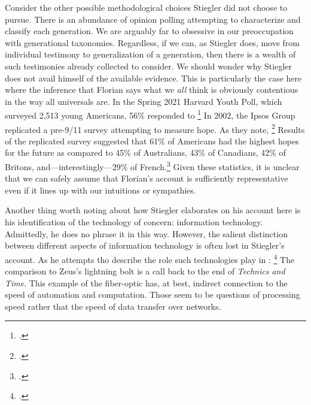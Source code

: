 \documentclass[letterpaper,notitlepage,12pt]{article}
\begin{document}
Consider the other possible methodological choices Stiegler did not choose to
pursue.
There is an abundance of opinion polling attempting to characterize and classify
each generation.
We are arguably far to obsessive in our preoccupation with generational
taxonomies.
Regardless, if we can, as Stiegler does, move from individual testimony to
generalization of a generation, then there is a wealth of such testimonies
already collected to consider.
We should wonder why Stiegler does not avail himself of the available evidence.
This is particularly the case here where the inference that Florian says what we
\textit{all} think is obviously contentious in the way all universals are.
In the Spring 2021 Harvard Youth Poll, which surveyed 2,513 young Americans,
56\% responded  to \footcite{noauthor_spring_nodate}
In 2002, the  Ipsos Group replicated a pre-9/11 survey attempting to measure
hope.
As they note, \footcite{noauthor_measuring_2002}
Results of the replicated survey suggested that 61\% of Americans had the
highest hopes for the future as compared to 45\% of Australians, 43\% of
Canadians, 42\% of Britons, and---interestingly---29\% of
French.\footcite{noauthor_measuring_2002}
Given these statistics, it is unclear that we can safely assume that Florian's
account is sufficiently representative even if it lines up with our intuitions
or sympathies.

Another thing worth noting about how Stiegler elaborates on his account here is
his identification of the technology of concern: information technology.
Admittedly, he does no phrase it in this way.
However, the salient distinction between different aspects of information
technology is often lost in Stiegler's account.
As he attempts tho describe the role such technologies play in
: \footcite[ch. 1.4]{stiegler_age_2019}
The comparison to Zeus's lightning bolt is a call back to the end of
\textit{Technics and Time}.
This example of the fiber-optic has, at best, indirect connection to the speed
of automation and computation.
Those seem to be questions of processing speed rather that the speed of data
transfer over networks.
\end{document}
